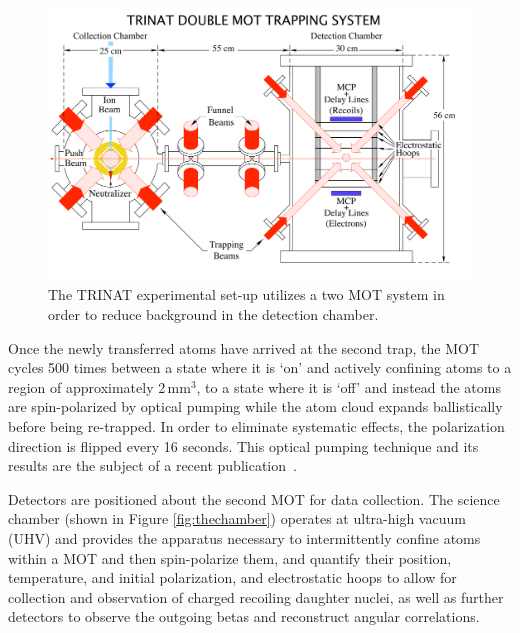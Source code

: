 \begin{figure}[t!h]
	\centering
	\includegraphics[width=.999\linewidth]
	{Figures/doublemot4.pdf}
	\caption{The TRINAT experimental set-up utilizes a two MOT system in order to reduce background in the detection chamber.}	
	\label{fig:doublemot}
\end{figure}

Once the newly transferred atoms have arrived at the second trap, the MOT cycles 500 times between a state where it is `on' and actively confining atoms to a region of approximately 2\,mm$^3$, to a state where it is `off' and instead the atoms are spin-polarized by optical pumping while the atom cloud expands ballistically before being re-trapped.  In order to eliminate systematic effects, the polarization direction is flipped every 16 seconds.  This optical pumping technique and its results are the subject of a recent publication~\cite{ben_OP}.

 
Detectors are positioned about the second MOT for data collection.  The science chamber (shown in Figure \ref{fig:thechamber}) operates at ultra-high vacuum (UHV) and provides the apparatus necessary to intermittently confine atoms within a MOT and then spin-polarize them, and quantify their position, temperature, and initial polarization, and electrostatic hoops to allow for collection and observation of charged recoiling daughter nuclei, as well as further detectors to observe the outgoing betas and reconstruct angular correlations.  

